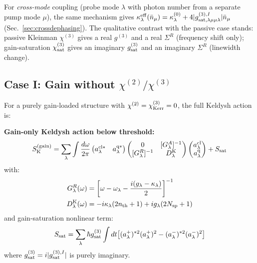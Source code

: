 \documentclass[12pt]{article}
\newcommand{\cl}{{\rm cl}}
\newcommand{\q}{{\rm q}}
\newcommand{\Keldysh}{{\rm K}}
\begin{document}
\begin{remark}
For \emph{cross-mode} coupling (probe mode $\lambda$ with photon
number from a separate pump mode $\mu$), the same mechanism gives
$\kappa_\lambda^{\rm eff}(\bar n_\mu) = \kappa_\lambda^{(0)}
+ 4|g^{(3),I}_{\rm sat,\lambda\mu\mu\lambda}|\bar n_\mu$
(Sec.~\ref{sec:crossdephasing}).  The qualitative contrast with
the passive case stands: passive Kleinman $\chi^{(3)}$ gives a real
$g^{(3)}$ and a real $\Sigma^R$ (frequency shift only); gain-saturation
$\chi^{(3)}_{\rm sat}$ gives an imaginary $g^{(3)}_{\rm sat}$ and an
imaginary $\Sigma^R$ (linewidth change).
\end{remark}

\subsection{Case I: Gain without $\chi^{(2)}/\chi^{(3)}$}
\label{sec:gain_only}

For a purely gain-loaded structure with $\chi^{(2)} = \chi^{(3)}_{\rm Kerr} = 0$,
the full Keldysh action is:

\begin{keyresult}
\textbf{Gain-only Keldysh action below threshold:}
\begin{equation}
  S_\Keldysh^{(\rm gain)} =
  \sum_\lambda\int\frac{d\omega}{2\pi}
  \begin{pmatrix}a^{\cl*}_\lambda & a^{\q*}_\lambda\end{pmatrix}
  \begin{pmatrix}0 & [G^A_\lambda]^{-1}\\
  [G^R_\lambda]^{-1} & D^\Keldysh_\lambda\end{pmatrix}
  \begin{pmatrix}a^\cl_\lambda\\a^\q_\lambda\end{pmatrix}
  + S_{\rm sat}
  \label{eq:gain_only_action}
\end{equation}
with:
\begin{align}
  G^R_\lambda(\omega) &= \left[\omega - \omega_\lambda
  - \frac{i(g_\lambda-\kappa_\lambda)}{2}\right]^{-1}
  \label{eq:GR_gain_only}\\
  D^\Keldysh_\lambda(\omega) &= -i\kappa_\lambda(2n_{\rm th}+1)
  + ig_\lambda(2N_{\rm sp}+1)
  \label{eq:DK_gain_only}
\end{align}
and gain-saturation nonlinear term:
\begin{equation}
  S_{\rm sat} = \sum_\lambda\hbar g^{(3)}_{\rm sat}
  \int dt\bigl[(a^+_\lambda)^{*2}(a^+_\lambda)^2
  - (a^-_\lambda)^{*2}(a^-_\lambda)^2\bigr]
  \label{eq:S_sat}
\end{equation}
where $g^{(3)}_{\rm sat} = i|g^{(3),I}_{\rm sat}|$ is purely imaginary.
\end{keyresult}
\end{document}
